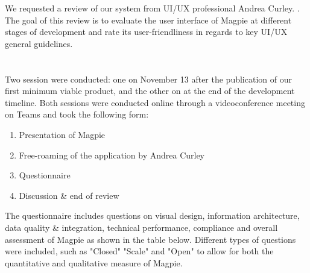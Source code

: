 We requested a review of our system from UI/UX professional Andrea Curley. .\\
The goal of this review is to evaluate the user interface of Magpie at different stages of development and rate its user-friendliness in regards to key UI/UX general guidelines.\\
 \\ \\

Two session were conducted: one on November 13 after the publication of our first minimum viable product, and the other on  at the end of the development timeline. Both sessions were conducted online through a videoconference meeting on Teams and took the following form:
\begin{enumerate}
  \item Presentation of Magpie
  \item Free-roaming of the application by Andrea Curley
  \item Questionnaire
  \item Discussion \& end of review
\end{enumerate}
The questionnaire includes questions on visual design, information architecture, data quality \& integration, technical performance, compliance and overall assessment of Magpie as shown in the table below. Different types of questions were included, such as "Closed" "Scale" and "Open" to allow for both the quantitative and qualitative measure of Magpie. \\ \\
